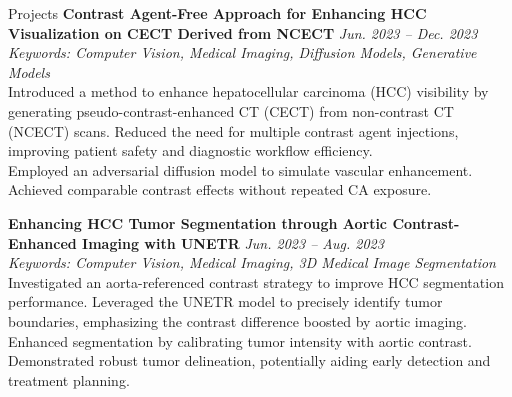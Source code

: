 \documentclass{resume}
\begin{document}
\begin{rSection}{Projects}
\bigskip
\textbf{Contrast Agent-Free Approach for Enhancing HCC Visualization on CECT Derived from NCECT} \hfill \textit{Jun. 2023 -- Dec. 2023} \\
\textit{Keywords: Computer Vision, Medical Imaging, Diffusion Models, Generative Models}  \\
\hspace*{1em} Introduced a method to enhance hepatocellular carcinoma (HCC) visibility by generating pseudo-contrast-enhanced CT (CECT) from non-contrast CT (NCECT) scans. Reduced the need for multiple contrast agent injections, improving patient safety and diagnostic workflow efficiency. \\
\hspace*{1em} Employed an adversarial diffusion model to simulate vascular enhancement.  
\hspace*{1em} Achieved comparable contrast effects without repeated CA exposure.

\bigskip
\textbf{Enhancing HCC Tumor Segmentation through Aortic Contrast-Enhanced Imaging with UNETR} \hfill \textit{Jun. 2023 -- Aug. 2023} \\
\textit{Keywords: Computer Vision, Medical Imaging, 3D Medical Image Segmentation}  \\
\hspace*{1em} Investigated an aorta-referenced contrast strategy to improve HCC segmentation performance. Leveraged the UNETR model to precisely identify tumor boundaries, emphasizing the contrast difference boosted by aortic imaging. \\
\hspace*{1em} Enhanced segmentation by calibrating tumor intensity with aortic contrast.  
\hspace*{1em} Demonstrated robust tumor delineation, potentially aiding early detection and treatment planning.


\end{rSection}
\end{document}
